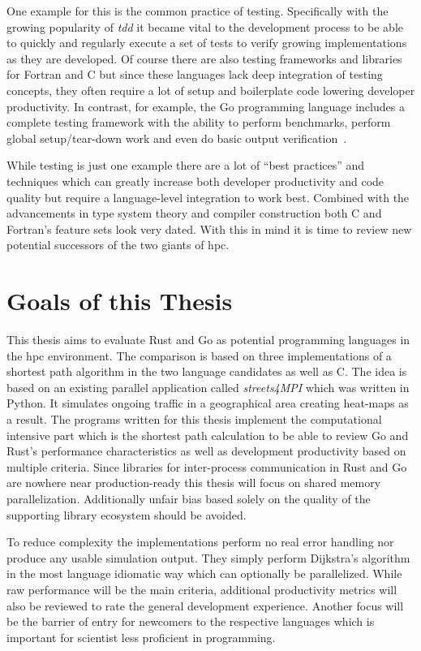One example for this is the common practice of testing. Specifically with the growing popularity of \textit{\gls{tdd}} it became vital to the development process to be able to quickly and regularly execute a set of tests to verify growing implementations as they are developed. Of course there are also testing frameworks and libraries for Fortran and C but since these languages lack deep integration of testing concepts, they often require a lot of setup and boilerplate code lowering developer productivity. In contrast, for example, the Go programming language includes a complete testing framework with the ability to perform benchmarks, perform global setup/tear-down work and even do basic output verification~\cite{go_doc_testing}.

While testing is just one example there are a lot of ``best practices'' and techniques which can greatly increase both developer productivity and code quality but require a language-level integration to work best. Combined with the advancements in type system theory and compiler construction both C and Fortran's feature sets look very dated. With this in mind it is time to review new potential successors of the two giants of \gls{hpc}.

\section{Goals of this Thesis}
\label{sec:Introduction::Goals}

This thesis aims to evaluate Rust and Go as potential programming languages in the \gls{hpc} environment. The comparison is based on three implementations of a shortest path algorithm in the two language candidates as well as C. The idea is based on an existing parallel application called \textit{streets4MPI} which was written in Python. It simulates ongoing traffic in a geographical area creating heat-maps as a result. The programs written for this thesis implement the computational intensive part which is the shortest path calculation to be able to review Go and Rust's performance characteristics as well as development productivity based on multiple criteria. Since libraries for inter-process communication in Rust and Go are nowhere near production-ready this thesis will focus on shared memory parallelization. Additionally unfair bias based solely on the quality of the supporting library ecosystem should be avoided.

To reduce complexity the implementations perform no real error handling nor produce any usable simulation output. They simply perform Dijkstra's algorithm in the most language idiomatic way which can optionally be parallelized. While raw performance will be the main criteria, additional productivity metrics will also be reviewed to rate the general development experience. Another focus will be the barrier of entry for newcomers to the respective languages which is important for scientist less proficient in programming.

